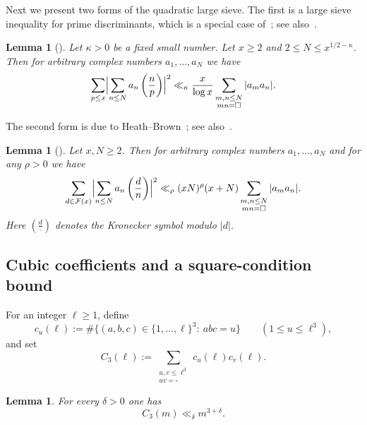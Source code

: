 \documentclass[11pt,letterpaper,reqno]{amsart}
\newtheorem{lemma}[theorem]{Lemma}
\theoremstyle{definition}
\numberwithin{equation}{section}
\newcommand{\Leg}[2]{\left(\frac{#1}{#2}\right)}
\newcommand{\1}{\mathbf{1}}
\begin{document}
Next we present two forms of the quadratic large sieve. The first is a large sieve inequality for prime
discriminants, which is a special case of~\cite[Lemma~9]{MoVa79}; see also~\cite[Lemma~4.8]{HL}.

\begin{lemma}[\cite{MoVa79}]\label{lem:LS-prime}
Let $\kappa>0$ be a fixed small number. Let $x\ge 2$ and $2\le N\le x^{1/2-\kappa}$. Then for arbitrary
complex numbers $a_1,\dots,a_N$ we have
\[
\sum_{p\le x}\Bigl|\sum_{n\le N} a_n \Leg{n}{p}\Bigr|^2
\ll_\kappa \frac{x}{\log x}\sum_{\substack{m,n\le N\\ mn=\square}}|a_m a_n|.
\]
\end{lemma}

The second form is due to Heath--Brown~\cite[Corollary~2]{HB95}; see also~\cite[Lemma~4.1]{La24}.

\begin{lemma}[\cite{HB95}]\label{lem:LS-HB}
Let $x,N\ge 2$. Then for arbitrary complex numbers $a_1,\dots,a_N$ and for any $\rho>0$ we have
\[
\sum_{d\in\mathcal{F}(x)}\Bigl|\sum_{n\le N} a_n \Leg{d}{n}\Bigr|^2
\ll_\rho (xN)^\rho (x+N)\sum_{\substack{m,n\le N\\ mn=\square}}|a_m a_n|.
\]Here $\Leg{d}{\cdot}$ denotes the Kronecker symbol modulo $|d|$.
\end{lemma}

\subsection{Cubic coefficients and a square-condition bound}

For an integer $\ell\ge 1$, define
\begin{equation}\label{eq:cu-def}
c_u(\ell):=\#\{(a,b,c)\in\{1,\dots,\ell\}^3:\ abc=u\}\qquad(1\le u\le \ell^3),
\end{equation}
and set
\begin{equation}
C_3(\ell):=\sum_{\substack{u,v\le \ell^3\\ uv=\square}} c_u(\ell)c_v(\ell).
\end{equation}







\begin{lemma}\label{lem:C3m-bound}
For every $\delta>0$ one has
\[
C_3(m)\ll_\delta m^{3+\delta}.
\]
\end{lemma}
\end{document}
